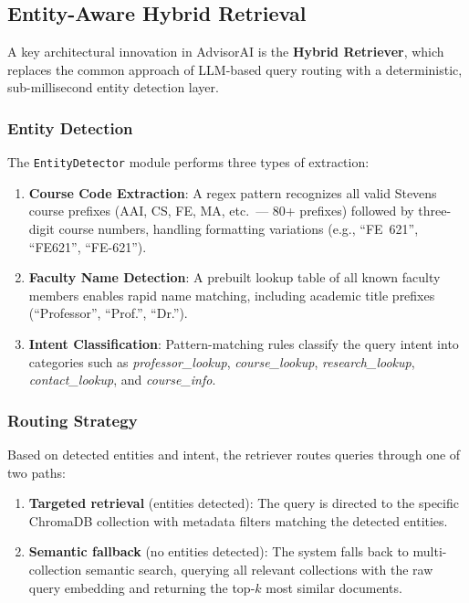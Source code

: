 \documentclass[conference,compsoc]{IEEEtran}
\begin{document}
\subsection{Entity-Aware Hybrid Retrieval}

A key architectural innovation in AdvisorAI is the \textbf{Hybrid Retriever}, which replaces the common approach of LLM-based query routing with a deterministic, sub-millisecond entity detection layer.

\subsubsection{Entity Detection}

The \texttt{EntityDetector} module performs three types of extraction:

\begin{enumerate}
    \item \textbf{Course Code Extraction}: A regex pattern recognizes all valid Stevens course prefixes (AAI, CS, FE, MA, etc.\ --- 80+ prefixes) followed by three-digit course numbers, handling formatting variations (e.g., ``FE~621'', ``FE621'', ``FE-621'').
    \item \textbf{Faculty Name Detection}: A prebuilt lookup table of all known faculty members enables rapid name matching, including academic title prefixes (``Professor'', ``Prof.'', ``Dr.'').
    \item \textbf{Intent Classification}: Pattern-matching rules classify the query intent into categories such as \textit{professor\_lookup}, \textit{course\_lookup}, \textit{research\_lookup}, \textit{contact\_lookup}, and \textit{course\_info}.
\end{enumerate}

\subsubsection{Routing Strategy}

Based on detected entities and intent, the retriever routes queries through one of two paths:

\begin{enumerate}
    \item \textbf{Targeted retrieval} (entities detected): The query is directed to the specific ChromaDB collection with metadata filters matching the detected entities.
    \item \textbf{Semantic fallback} (no entities detected): The system falls back to multi-collection semantic search, querying all relevant collections with the raw query embedding and returning the top-$k$ most similar documents.
\end{enumerate}
\end{document}
